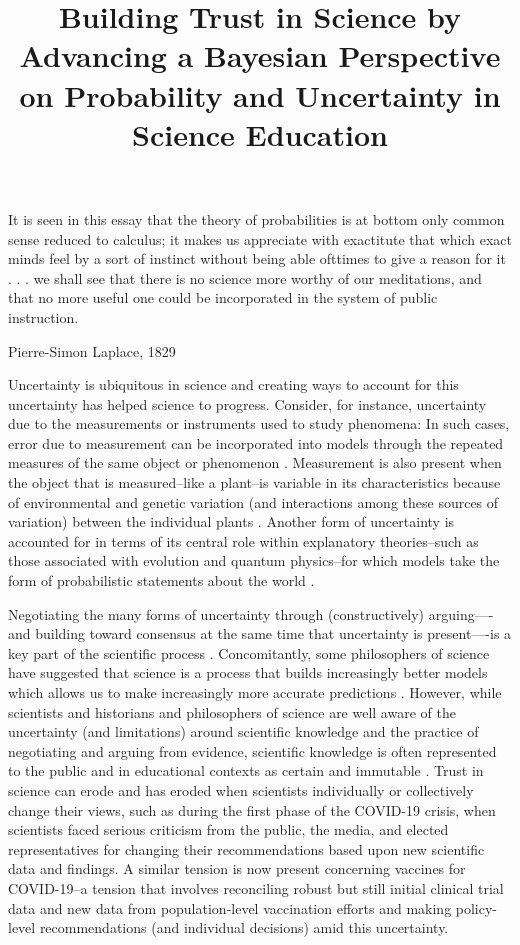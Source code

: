 \documentclass[man]{apa7}
\title{Building Trust in Science by Advancing a Bayesian Perspective on Probability and Uncertainty in Science Education}
\begin{document}
\maketitle

\setlength{\epigraphwidth}{1.0\textwidth} %
\epigraph{It is seen in this essay that the theory of probabilities is at bottom only common sense reduced to calculus; it makes us appreciate with exactitute that which exact minds feel by a sort of instinct without being able ofttimes to give a reason for it . . . we shall see that there is no science more worthy of our meditations, and that no more useful one could be incorporated in the system of public instruction.}{Pierre-Simon Laplace, 1829}
\setlength{\epigraphwidth}{0.4\textwidth} %

Uncertainty is ubiquitous in science and creating ways to account for this uncertainty has helped science to progress. Consider, for instance, uncertainty due to the measurements or instruments used to study phenomena: In such cases, error due to measurement can be incorporated into models through the repeated measures of the same object or phenomenon \parencite{pls03}. Measurement is also present when the object that is measured--like a plant--is variable in its characteristics because of environmental and genetic variation (and interactions among these sources of variation) between the individual plants \parencite{pls03}. Another form of uncertainty is accounted for in terms of its central role within explanatory theories--such as those associated with evolution and quantum physics--for which models take the form of probabilistic statements about the world \parencite{g00}. 

Negotiating the many forms of uncertainty through (constructively) arguing—-and building toward consensus at the same time that uncertainty is present—-is a key part of the scientific process \parencite{duschl2008science, t00, nrc12}. Concomitantly, some philosophers of science have suggested that science is a process that builds increasingly better models which allows us to make increasingly more accurate predictions \parencite{g10, g06, n02, r77}. However, while scientists and historians and philosophers of science are well aware of the uncertainty (and limitations) around scientific knowledge and the practice of negotiating and arguing from evidence, scientific knowledge is often represented to the public and in educational contexts as certain and immutable \parencite{d90}. Trust in science can erode and has eroded when scientists individually or collectively change their views, such as during the first phase of the COVID-19 crisis, when scientists faced serious criticism from the public, the media, and elected representatives for changing their recommendations based upon new scientific data and findings. A similar tension is now present concerning vaccines for COVID-19--a tension that involves reconciling robust but still initial clinical trial data and new data from population-level vaccination efforts and making policy-level recommendations (and individual decisions) amid this uncertainty. \\
\end{document}
